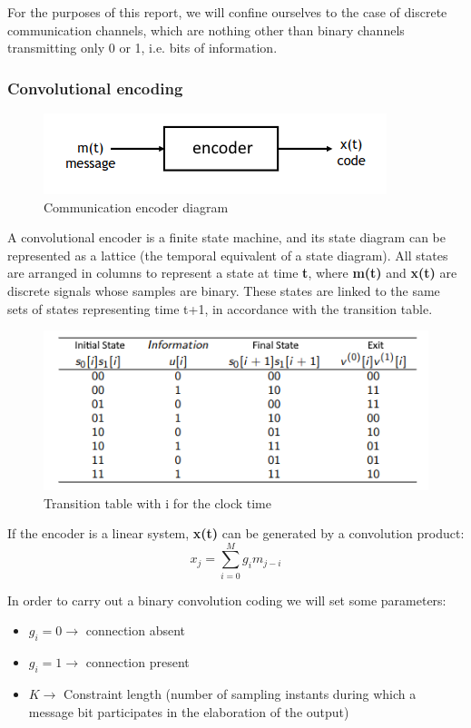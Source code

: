 For the purposes of this report, we will confine ourselves to the case of discrete communication channels, which are nothing other than binary channels transmitting only 0 or 1, i.e. bits of information.

\subsubsection{Convolutional encoding}

\begin{figure}[H]
    \centering
    \includegraphics[width=0.5\linewidth]{images/encodeur_schem.png}
    \caption{Communication encoder diagram}
    \label{fig:encoder-diagram}
\end{figure}

A convolutional encoder is a finite state machine, and its state diagram can be represented as a lattice (the temporal equivalent of a state diagram). All states are arranged in columns to represent a state at time \textbf{t}, where \textbf{m(t)} and \textbf{x(t)} are discrete signals whose samples are binary. These states are linked to the same sets of states representing time t+1, in accordance with the transition table.

\begin{figure}[H]
    \centering
    \includegraphics[width=0.5\linewidth]{images/transitionTable.png}
    \caption{Transition table with i for the clock time}
    \label{fig:transition-table}
\end{figure}

If the encoder is a linear system, \textbf{x(t)} can be generated by a convolution product:
\[ x_{j} = \sum_{i=0}^M g_{i}m_{j-i} \]

In order to carry out a binary convolution coding we will set some parameters:
\begin{itemize}
     \item $g_{i} = 0 \rightarrow$ connection absent
     \item $g_{i} = 1 \rightarrow$ connection present
     \item $K \rightarrow$ Constraint length (number of sampling instants during which a message bit participates in the elaboration of the output)
\end{itemize}

